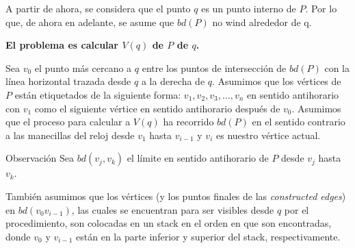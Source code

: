 \documentclass[aspectratio=169,xcolor=dvipsnames, t]{beamer}
\begin{document}

\begin{frame}[c]
    A partir de ahora, se considera que el punto $q$ es un punto interno de $P$. Por lo que, de ahora en adelante, se asume que $bd(P)$ no wind alrededor de q.
    \vspace{0.5cm}
    \begin{center}
        \textbf{El problema es calcular $V(q)$ de $P$ de $q$.}
    \end{center}
\end{frame}


\begin{frame}[c]
    Sea $v_{0}$ el punto más cercano a $q$ entre los puntos de intersección de $bd(P)$ con la línea horizontal trazada desde $q$ a la derecha de $q$.
    \vspace{0.5cm}
    Asumimos que los vértices de $P$ están etiquetados de la siguiente forma: $v_{1},v_{2}, v_{3}, \dots , v_{n}$ en sentido antihorario con $v_{1}$ como el siguiente vértice en sentido antihorario después de $v_{0}$.
    \vspace{0.5cm}
    Asumimos que el proceso para calcular a $V(q)$ ha recorrido $bd(P)$ en el sentido contrario a las manecillas del reloj desde $v_{1}$ hasta $v_{i-1}$ y $v_{i}$ es nuestro vértice actual.
\end{frame}


\begin{frame}[c]
    \begin{block}{Observación}
        Sea $bd(v_{j}, v_{k})$ el límite en sentido antihorario de $P$ desde $v_{j}$ hasta $v_{k}$.    
    \end{block}
    \vspace{0.5cm}
    También asumimos que los vértices (y los puntos finales de las \textit{constructed edges}) en $bd(v_{0} v_{i-1})$, las cuales se encuentran para ser visibles desde $q$ por el procedimiento, son colocadas en un stack en el orden en que son encontradas, donde $v_{0}$ y $v_{i-1}$ están en la parte inferior y superior del stack, respectivamente.\\  
\end{frame}

\end{document}
